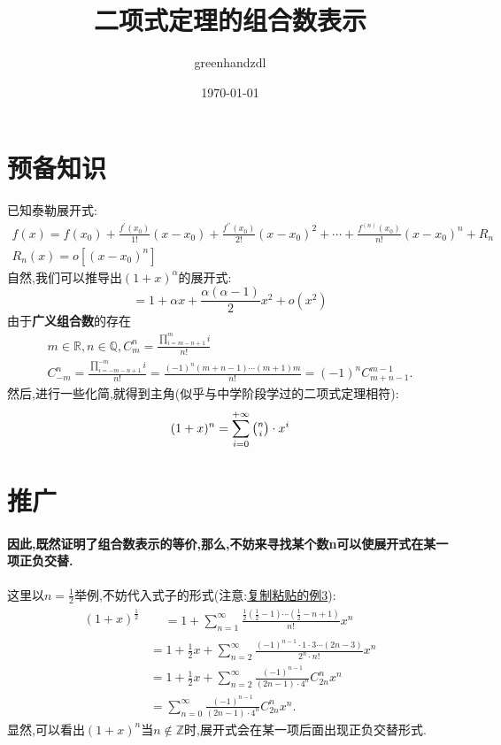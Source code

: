 \documentclass[a4paper,12pt]{ctexart}
\begin{document}
\title{二项式定理的组合数表示}
\author{greenhandzdl}
\date{\today}
\maketitle

\tableofcontents
\newpage
{}

\section{预备知识}
\noindent 已知泰勒展开式:
\begin{eqnarray}
f(x)=f(x_{0})+\frac{f^{\prime}(x_{0})}{1!}(x-x_{0})+\frac{f^{\prime\prime}(x_{0})}{2!}(x-x_{0})^{2}+\cdots+\frac{f^{(n)}(x_{0})}{n!}(x-x_{0})^{n}+R_{n} \\
R_{n}(x)=o[(x-x_{0})^{n}]
\end{eqnarray}
自然,我们可以推导出$(1+x)^\alpha$的展开式:
\begin{equation}
=1+\alpha x+\frac{\alpha(\alpha-1)}{2}x^2+o(x^2)
\end{equation}
由于\textbf{广义组合数}的存在
\begin{eqnarray}
m \in \mathbb{R},n \in \mathbb{Q},C_m^n=\frac{\prod_{i=m-n+1}^mi}{n!} \\
C_{-m}^{n}=\frac{\prod_{i=-m-n+1}^{-m}i}{n!}=\frac{(-1)^n(m+n-1)\cdots(m+1)m}{n!}=(-1)^nC_{m+n-1}^{m-1}.
\end{eqnarray}
然后,进行一些化简,就得到主角(似乎与中学阶段学过的二项式定理相符):
\begin{equation}
(1+x)^n = \sum_{i=0}^{+ \infty }  \tbinom{n}{i} \cdot x^i
\end{equation}

\section{推广}
\paragraph{因此,既然证明了组合数表示的等价,那么,不妨来寻找某个数n可以使展开式在某一项正负交替.}
这里以$ n= \frac{1}{2}  $举例,不妨代入式子的形式(注意:\href{https://zhuanlan.zhihu.com/p/358479652}{复制粘贴的例3}):
\begin{equation}
\begin{aligned}(1+x)^{\frac{1}{2}}
	&\begin{aligned}&=1+\sum_{n=1}^\infty\frac{\frac{1}{2}(\frac{1}{2}-1)\cdots(\frac{1}{2}-n+1)}{n!}x^n\end{aligned}\\
	&=1+\frac{1}{2}x+\sum_{n=2}^\infty\frac{(-1)^{n-1}\cdot1\cdot3\cdots(2n-3)}{2^n\cdot n!}x^n\\
	&=1+\frac{1}{2}x+\sum_{n=2}^\infty\frac{(-1)^{n-1}}{(2n-1)\cdot4^n}C_{2n}^nx^n\\
	&=\sum_{n=0}^\infty\frac{(-1)^{n-1}}{(2n-1)\cdot4^n}C_{2n}^nx^n.\end{aligned}
\end{equation}
显然,可以看出$(1+x)^n$当$n \not \in \mathbb{Z} $时,展开式会在某一项后面出现正负交替形式.
\end{document}
